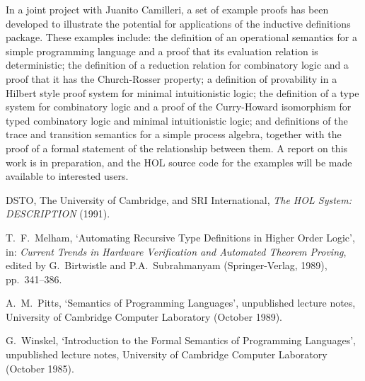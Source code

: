 In a joint project with Juanito Camilleri, a set of example proofs has
been developed to illustrate the potential for applications of the inductive
\mbox{definitions} package.  These examples include: the definition of an
operational semantics for a simple programming language and a proof that its
evaluation relation is \mbox{deterministic}; the definition of a reduction
relation for combinatory logic and a proof that it has the Church-Rosser
property; a definition of \mbox{provability} in a Hilbert style proof system
for minimal intuitionistic logic; the definition of a type system for
combinatory logic and a proof of the Curry-Howard isomorphism for typed
combinatory logic and minimal intuitionistic logic; and definitions of the
trace and transition semantics for a simple process algebra, \mbox{together}
with the proof of a formal statement of the relationship between them. A report
on this work is in preparation, and the {\small HOL} source code for the
examples will be made available to interested users.

\newpage

\begin{thebibliography}{9}

DSTO, The University of Cambridge, and SRI
\mbox{International}, {\it The HOL System: DESCRIPTION} (1991).

T.\ F.\ Melham, `Automating Recursive Type Definitions 
in Higher Order Logic',
in: {\it Current Trends in Hardware Verification and
Automated Theorem Proving\/}, edited by G.\ Birtwistle 
and P.A.\ Subrahmanyam
(Springer-Verlag, 1989), pp.\ 341--386.

A.\ M.\ Pitts, `Semantics of Programming Languages', 
unpublished lecture notes, University of Cambridge Computer Laboratory
(October 1989).

G.\ Winskel, `Introduction to the Formal Semantics of
Programming Languages', unpublished lecture notes, University of Cambridge
Computer Laboratory (October 1985).

\end{thebibliography}


